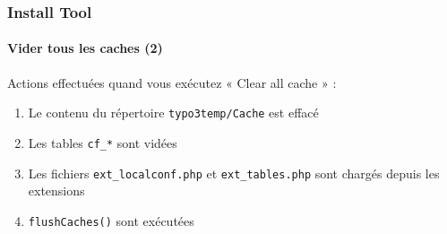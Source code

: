 
\begin{frame}[fragile]
	\frametitle{Install Tool}
	\framesubtitle{Vider tous les caches (2)}

	Actions effectuées quand vous exécutez « Clear all cache » :

	\begin{enumerate}
		\item Le contenu du répertoire \texttt{typo3temp/Cache} est effacé
		\item Les tables \texttt{cf\_*} sont vidées
		\item Les fichiers \texttt{ext\_localconf.php} et \texttt{ext\_tables.php}\newline
			sont chargés depuis les extensions
		\item \texttt{flushCaches()} sont exécutées
	\end{enumerate}

\end{frame}


